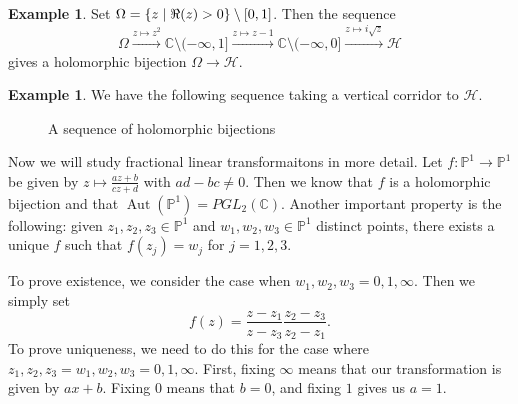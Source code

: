 \documentclass[leqno, openany]{memoir}
\theoremstyle{definition}
\newtheorem{exm}[thm]{Example}
\theoremstyle{remark}
\theoremstyle{plain}
\theoremstyle{definition}
\theoremstyle{remark}
\newcommand{\C}{\mathbb{C}}
\renewcommand{\P}{\mathbb{P}}
\newcommand{\mc}[1]{\mathcal{#1}}
\DeclareMathOperator{\Aut}{Aut}
\begin{document}
\begin{exm} Set $\Omega = \qty{z \mid \real (z) > 0} \setminus [0,1]$. Then the
    sequence \[ \Omega \xrightarrow{z \mapsto z^2} \C \setminus (-\infty, 1]
    \xrightarrow{z \mapsto z-1} \C \setminus (-\infty, 0] \xrightarrow{z
\mapsto i\sqrt{z}} \mc{H} \] gives a holomorphic bijection $\Omega \to \mc{H}$.
\end{exm}

\begin{exm} We have the following sequence taking a vertical corridor to
    $\mc{H}$.  \begin{figure}[H] \begin{center}  \end{center} \caption{A sequence of
                    holomorphic bijections}%
                \end{figure}
                \end{exm}

Now we will study fractional linear transformaitons in more detail. Let $f
\colon \P^1 \to \P^1$ be given by $z \mapsto \frac{az+b}{cz+d}$ with $ad-bc
\neq 0$. Then we know that $f$ is a holomorphic bijection and that $\Aut(\P^1)
= PGL_2(\C)$. Another important property is the following: given $z_1, z_2, z_3
\in \P^1$ and $w_1, w_2, w_3 \in \P^1$ distinct points, there exists a unique
$f$ such that $f(z_j) = w_j$ for $j = 1,2,3$.

To prove existence, we consider the case when $w_1, w_2, w_3 = 0,1,\infty$.
Then we simply set \[ f(z) = \frac{z - z_1}{z-z_3} \frac{z_2 - z_3}{z_2 - z_1}.
\] To prove uniqueness, we need to do this for the case where $z_1,z_2,z_3 =
w_1,w_2,w_3 = 0,1,\infty$. First, fixing $\infty$ means that our transformation
is given by $ax + b$. Fixing $0$ means that $b = 0$, and fixing $1$ gives us $a
= 1$.
\end{document}
